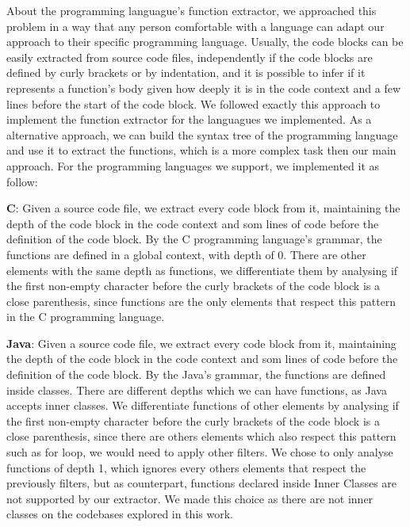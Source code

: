 About the programming languague's function extractor, we approached this problem in a way that any person comfortable with a language
can adapt our approach to their specific programming language. Usually, the code blocks can be easily extracted from 
source code files, independently if the code blocks are defined by curly brackets or by indentation, and it is possible to
infer if it represents a function's body given how deeply it is in the code context and a few lines before the start 
of the code block. We followed exactly this approach to implement the function extractor for the languagues we implemented. 
As a alternative approach, we can build the syntax tree \citep{compiler} of the programming language and use it to 
extract the functions, which is a more complex task then our main approach. For the programming languages we support, we implemented
it as follow:

\begin{itemize}
	\begin{item}
		\textbf{C}: Given a source code file, we extract every code block from it, maintaining the depth of the code block in
		the code context and som lines of code before the definition of the code block. By the C programming language's grammar, 
		the functions are defined in a global context, with depth of 0. There are other elements with the same depth as functions,
		we differentiate them by analysing if the first non-empty character before the curly brackets of the code block is a close 
		parenthesis, since functions are the only elements that respect this pattern in the C programming language.
	\end{item}
	\begin{item}
		\textbf{Java}: Given a source code file, we extract every code block from it, maintaining the depth of the code block in
		the code context and som lines of code before the definition of the code block. By the Java's grammar, 
		the functions are defined inside classes. There are different depths which we can have functions, as Java accepts inner
		classes. We differentiate functions of other elements by analysing if the first non-empty character before the curly brackets of the code block is a close 
		parenthesis, since there are others elements which also respect this pattern such as for loop, we would need to apply other 
		filters. We chose to only analyse functions of depth 1, which ignores every others elements that respect the previously
		filters, but as counterpart, functions declared inside Inner Classes are not supported by our extractor. We made this choice
		as there are not inner classes on the codebases explored in this work.

	\end{item}
\end{itemize}

